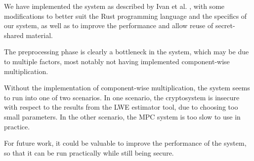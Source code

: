 \documentclass[../main.tex]{subfiles}
\begin{document}
We have implemented the system as described by Ivan et al. \cite{damgaard2012multiparty}, with some modifications to better suit the Rust programming language and the specifics of our system, as well as to improve the performance and allow reuse of secret-shared material.

The preprocessing phase is clearly a bottleneck in the system, which may be due to multiple factors, most notably not having implemented component-wise multiplication.

Without the implementation of component-wise multiplication, the system seems to run into one of two scenarios.
In one scenario, the cryptosystem is insecure with respect to the results from the LWE estimator tool, due to choosing too small parameters.
In the other scenario, the MPC system is too slow to use in practice.

For future work, it could be valuable to improve the performance of the system, so that it can be run practically while still being secure.
\end{document}
